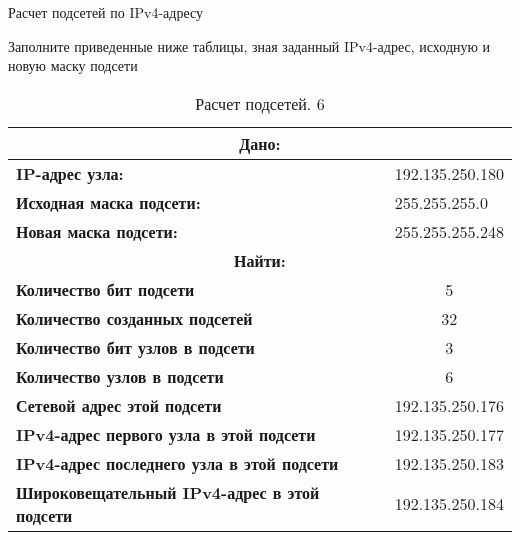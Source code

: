 \documentclass[a4paper,14pt]{extarticle}
\begin{document}
\begin{mypart}{Расчет подсетей по IPv4-адресу}
\begin{step}{Заполните приведенные ниже таблицы, зная заданный IPv4-адрес, исходную и
			новую маску подсети}
\begin{table}[h]
	\centering
	\caption{Расчет подсетей. 6}
	\begin{tabular}{|l|l|}
		\hline
			\multicolumn{2}{|c|}{\textbf{Дано:}}  \\ \hline
		\textbf{IP-адрес узла:} & 192.135.250.180 \\ \hline
		\textbf{Исходная маска подсети:} & 255.255.255.0 \\ \hline
		\textbf{Новая маска подсети:} & 255.255.255.248 \\ \hline
			\multicolumn{2}{|c|}{\textbf{Найти:}}  \\ \hline
		\textbf{Количество бит подсети} & \multicolumn{1}{c|}{5} \\ \hline
		\textbf{Количество созданных подсетей} & \multicolumn{1}{c|}{32} \\ \hline
		\textbf{Количество бит узлов в подсети} & \multicolumn{1}{c|}{3} \\ \hline
		\textbf{Количество узлов в подсети} & \multicolumn{1}{c|}{6} \\ \hline
		\textbf{Сетевой адрес этой подсети} & 192.135.250.176 \\ \hline
		\textbf{IPv4-адрес первого узла в этой подсети} & 192.135.250.177 \\ \hline
		\textbf{IPv4-адрес последнего узла в этой подсети} & 192.135.250.183 \\ \hline
		\textbf{Широковещательный IPv4-адрес в этой подсети} & 192.135.250.184 \\ \hline
	\end{tabular}
	\label{}
	\end{table}
	\end{step}
\end{mypart}
\end{document}
